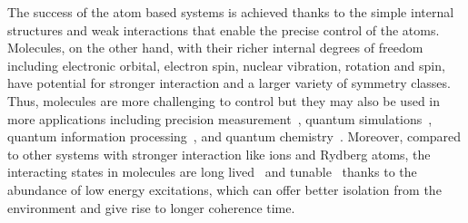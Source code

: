 The success of the atom based systems is achieved thanks to
the simple internal structures and weak interactions
that enable the precise control of the atoms.
Molecules, on the other hand, with their richer internal degrees of freedom
including electronic orbital, electron spin, nuclear vibration, rotation and spin,
have potential for stronger interaction and a larger variety of symmetry classes.
Thus, molecules are more challenging to control
but they may also be used in more applications including
precision measurement~\cite{bickman_preparation_2009,hudson_improved_2011,eckel_search_2013,
  kozyryev_precision_2017,cairncross_precision_2017,acme_collaboration_improved_2018,
  kondov_molecular_2019,flambaum_electric_2020},
quantum simulations~\cite{micheli_toolbox_2006,buchler_strongly_2007,gorshkov_tunable_2011,
  baranov_condensed_2012,yao_realizing_2013,syzranov_spin-orbital_2014,
  wall_quantum_2015,wall_realizing_2015,peter_topological_2015,
  yao_quantum_2018,sundar_synthetic_2018,schuster_realizing_2019},
quantum information processing~\cite{demille_quantum_2002,ni_dipolar_2018,
  hudson_dipolar_2018,lin_quantum_2020},
and quantum chemistry~\cite{balakrishnan_perspective_2016,hu_direct_2019,
  segev_collisions_2019,jongh_imaging_2020}.
Moreover, compared to other systems with stronger interaction like ions and Rydberg atoms,
the interacting states in molecules are long lived~\cite{fedorov_accurate_2014}
and tunable~\cite{giovanazzi_tuning_2002} thanks to the abundance of low energy excitations,
which can offer better isolation from the environment and give rise to longer coherence time.

